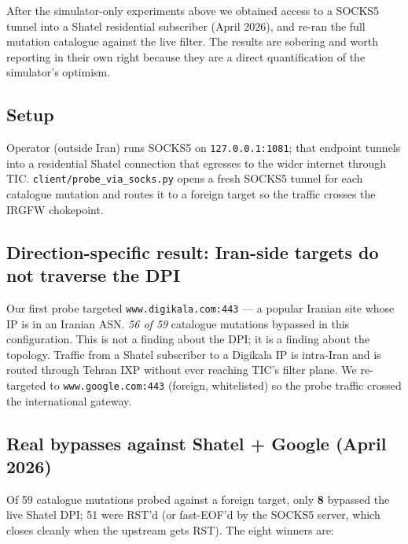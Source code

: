 \documentclass[letterpaper,twocolumn,10pt]{article}
\begin{document}
After the simulator-only experiments above we obtained access to a
SOCKS5 tunnel into a Shatel residential subscriber (April 2026), and
re-ran the full mutation catalogue against the live filter. The
results are sobering and worth reporting in their own right because
they are a direct quantification of the simulator's optimism.

\subsection{Setup}

Operator (outside Iran) runs SOCKS5 on \texttt{127.0.0.1:1081}; that
endpoint tunnels into a residential Shatel connection that egresses
to the wider internet through TIC. \texttt{client/probe\_via\_socks.py}
opens a fresh SOCKS5 tunnel for each catalogue mutation and routes
it to a foreign target so the traffic crosses the IRGFW chokepoint.

\subsection{Direction-specific result: Iran-side targets do not
traverse the DPI}

Our first probe targeted \texttt{www.digikala.com:443} — a popular
Iranian site whose IP is in an Iranian ASN. \emph{56 of 59} catalogue
mutations bypassed in this configuration. This is not a finding
about the DPI; it is a finding about the topology. Traffic from a
Shatel subscriber to a Digikala IP is intra-Iran and is routed
through Tehran IXP without ever reaching TIC's filter plane. We
re-targeted to \texttt{www.google.com:443} (foreign, whitelisted) so
the probe traffic crossed the international gateway.

\subsection{Real bypasses against Shatel + Google (April 2026)}

Of 59 catalogue mutations probed against a foreign target, only
\textbf{8} bypassed the live Shatel DPI; 51 were RST'd (or
fast-EOF'd by the SOCKS5 server, which closes cleanly when the
upstream gets RST). The eight winners are:
\end{document}
